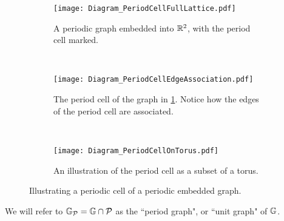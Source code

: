 \begin{figure}[b!]
	\centering
	\begin{subfigure}[t]{0.45\textwidth}
		\centering
		\texttt{[image: Diagram\_PeriodCellFullLattice.pdf]}
		\caption{\label{fig:Diagram_PeriodCellFullLattice} A periodic graph embedded into $\mathbb{R}^2$, with the period cell marked.}
	\end{subfigure}
	~
	\begin{subfigure}[t]{0.45\textwidth}
		\centering
		\texttt{[image: Diagram\_PeriodCellEdgeAssociation.pdf]}
		\caption{\label{fig:Diagram_PeriodCellEdgeAssociation} The period cell of the graph in \ref{fig:Diagram_PeriodCellFullLattice}. Notice how the edges of the period cell are associated.}
	\end{subfigure}
	\\
	\begin{subfigure}[b]{0.75\textwidth}
		\centering
		\texttt{[image: Diagram\_PeriodCellOnTorus.pdf]}
		\caption{\label{fig:Diagram_PeriodCellOnTorus} An illustration of the period cell as a subset of a torus.}
	\end{subfigure}
	\caption{\label{fig:PeriodCellIllustration} Illustrating a periodic cell of a periodic embedded graph.}
\end{figure} 
We will refer to $\mathbb{G}_{\mathcal{P}} = \mathbb{G} \cap \mathcal{P}$ as the ``period graph", or ``unit graph" of $\mathbb{G}$.

